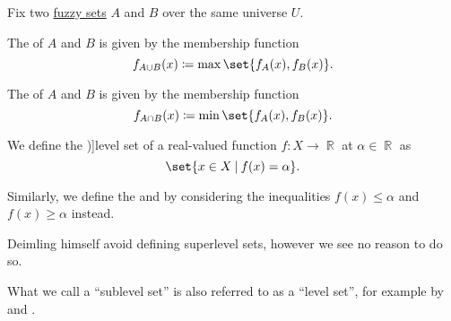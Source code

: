 \begin{definition}\label{def:basic_fuzzy_set_operations}
  Fix two \hyperref[def:fuzzy_set]{fuzzy sets} \( A \) and \( B \) over the same universe \( U \).

  \begin{thmenum}
     The  of \( A \) and \( B \) is given by the membership function
    \begin{equation}\label{eq:def:basic_fuzzy_set_operations/union}
      f_{A \cup B} (x) \coloneqq \max\set{ f_A(x), f_B(x) }.
    \end{equation}

     The  of \( A \) and \( B \) is given by the membership function
    \begin{equation}\label{eq:def:basic_fuzzy_set_operations/intersection}
      f_{A \cap B} (x) \coloneqq \min\set{ f_A(x), f_B(x) }.
    \end{equation}
  \end{thmenum}
\end{definition}

\begin{definition}\label{def:level_set}
  We define the \term[ru=множество уровня (\cite[\S 1.7.3]{Новиков2013ДискретнаяМатематика})]{level set} of a real-valued function \( f: X \to \BbbR \) at \( \alpha \in \BbbR \) as
  \begin{equation*}
    \set{ x \in X \given f(x) = \alpha }.
  \end{equation*}

  Similarly, we define the  and  by considering the inequalities \( f(x) \leq \alpha \) and \( f(x) \geq \alpha \) instead.
\end{definition}
\begin{comments}
  \item Deimling himself avoid defining superlevel sets, however we see no reason to do so.

  \item What we call a \enquote{sublevel set} is also referred to as a \enquote{level set}, for example by  and .
\end{comments}

